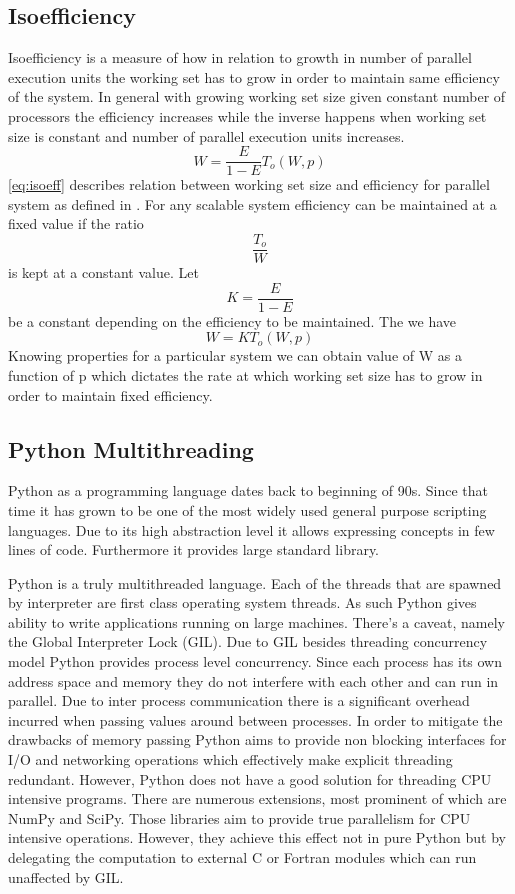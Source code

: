 \documentclass[12pt, a4paper]{report}
\begin{document}
\subsection{Isoefficiency}\label{subsec:isoeff}
Isoefficiency is a measure of how in relation to growth in number of parallel execution units the working set has to grow in order to maintain same efficiency of the system. In general with growing working set size given constant number of processors the efficiency increases while the inverse happens when working set size is constant and number of parallel execution units increases.
\begin{equation}\label{eq:isoeff} W = \dfrac{E}{1-E}T_o(W,p) \end{equation}
\ref{eq:isoeff} describes relation between working set size and efficiency for parallel system as defined in \cite{grama2003introduction}.
For any scalable system efficiency can be maintained at a fixed value if the ratio \[\dfrac{T_o}{W}\] is kept at a constant value.
Let \[K = \dfrac{E}{1-E}\] be a constant depending on the efficiency to be maintained. The we have
\begin{equation}\label{eq:isoconst} W = KT_o(W,p) \end{equation} Knowing properties for a particular system we can obtain value of W
as a function of p which dictates the rate at which working set size has to grow in order to maintain fixed efficiency.

\subsection{Python Multithreading}\label{subsec:mult-py}
Python as a programming language dates back to beginning of 90s. Since that
time it has grown to be one of the most widely used general purpose scripting
languages. Due to its high abstraction level it allows expressing concepts in
few lines of code. Furthermore it provides large standard library.

Python is a truly multithreaded language. Each of the threads that are spawned
by interpreter are first class operating system threads. As such Python gives
ability to write applications running on large machines. There's a caveat, namely
the Global Interpreter Lock (GIL). Due to GIL besides threading concurrency model
Python provides process level concurrency. Since each process has its own address
space and memory they do not interfere with each other and can run in parallel.
Due to inter process communication there is a significant overhead incurred
when passing values around between processes. In order to mitigate the drawbacks
of memory passing Python aims to provide non blocking interfaces for I/O and
networking operations which effectively make explicit threading redundant. However,
Python does not have a good solution for threading CPU intensive programs. There are
numerous extensions, most prominent of which are NumPy and SciPy. Those libraries aim to provide
true parallelism for CPU intensive operations. However, they achieve this effect
not in pure Python but by delegating the computation to external C or Fortran modules
which can run unaffected by GIL.
\end{document}
